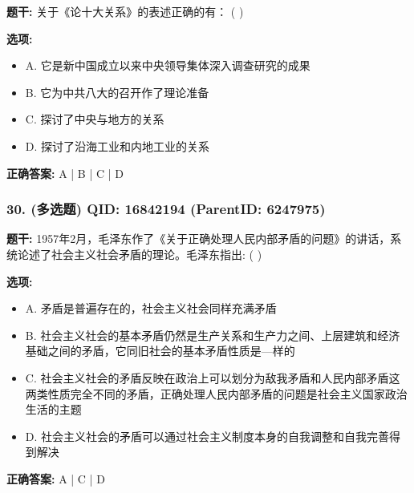 \documentclass[12pt,UTF8]{ctexart}
\begin{document}
\textbf{题干:}
关于《论十大关系》的表述正确的有： ( )



\textbf{选项:}
\begin{itemize}[leftmargin=*]

  \item A. 它是新中国成立以来中央领导集体深入调查研究的成果

  \item B. 它为中共八大的召开作了理论准备

  \item C. 探讨了中央与地方的关系

  \item D. 探讨了沿海工业和内地工业的关系

\end{itemize}

\textbf{正确答案:}
A | B | C | D

\vspace{0.3em}\hrulefill\vspace{0.7em}

\subsubsection*{30. (多选题) \small QID: 16842194 (ParentID: 6247975)}

\textbf{题干:}
1957年2月，毛泽东作了《关于正确处理人民内部矛盾的问题》的讲话，系统论述了社会主义社会矛盾的理论。毛泽东指出: ( )



\textbf{选项:}
\begin{itemize}[leftmargin=*]

  \item A. 矛盾是普遍存在的，社会主义社会同样充满矛盾

  \item B. 社会主义社会的基本矛盾仍然是生产关系和生产力之间、上层建筑和经济基础之间的矛盾，它同旧社会的基本矛盾性质是—样的

  \item C. 社会主义社会的矛盾反映在政治上可以划分为敌我矛盾和人民内部矛盾这两类性质完全不同的矛盾，正确处理人民内部矛盾的问题是社会主义国家政治生活的主题

  \item D. 社会主义社会的矛盾可以通过社会主义制度本身的自我调整和自我完善得到解决

\end{itemize}

\textbf{正确答案:}
A | C | D
\end{document}
